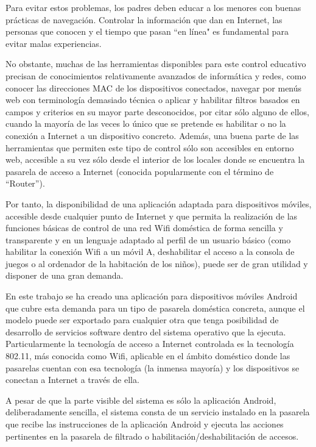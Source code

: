 \documentclass[12pt]{article}
\begin{document}
Para evitar estos problemas, los padres deben educar a los menores con buenas prácticas de navegación. Controlar la información que dan en Internet, las personas que conocen y el tiempo que pasan ``en línea" es fundamental para evitar malas experiencias. 

No obstante, muchas de las herramientas disponibles para este control educativo precisan de conocimientos relativamente avanzados de informática y redes, como conocer las direcciones MAC de los dispositivos conectados, navegar por menús web con terminología demasiado técnica o aplicar y habilitar filtros basados en campos y criterios en su mayor parte desconocidos, por citar sólo alguno de ellos, cuando la mayoría de las veces lo único que se pretende es habilitar o no la conexión a Internet a un dispositivo concreto. Además, una buena parte de las herramientas que permiten este tipo de control sólo son accesibles en entorno web, accesible a su vez sólo desde el interior de los locales donde se encuentra la pasarela de acceso a Internet (conocida popularmente con el término de ``Router'').

Por tanto, la disponibilidad de una aplicación adaptada para dispositivos móviles, accesible desde cualquier punto de Internet y que permita la realización de las funciones básicas de control de una red Wifi doméstica de forma sencilla y transparente y en un lenguaje adaptado al perfil de un usuario básico (como habilitar la conexión Wifi a un móvil A, deshabilitar el acceso a la consola de juegos o al ordenador de la habitación de los niños), puede ser de gran utilidad y disponer de una gran demanda.

En este trabajo se ha creado una aplicación para dispositivos móviles Android que cubre esta demanda para un tipo de pasarela doméstica concreta, aunque el modelo puede ser exportado para cualquier otra que tenga posibilidad de desarrollo de servicios software dentro del sistema operativo que la ejecuta. Particularmente la tecnología de acceso a Internet controlada es la tecnología 802.11, más conocida como Wifi, aplicable en el ámbito doméstico donde las pasarelas cuentan con esa tecnología (la inmensa mayoría) y los dispositivos se conectan a Internet a través de ella.

A pesar de que la parte visible del sistema es sólo la aplicación Android, deliberadamente sencilla, el sistema consta de un servicio instalado en la pasarela que recibe las instrucciones de la aplicación Android y ejecuta las acciones pertinentes en la pasarela de filtrado o habilitación/deshabilitación de accesos. 
\end{document}
